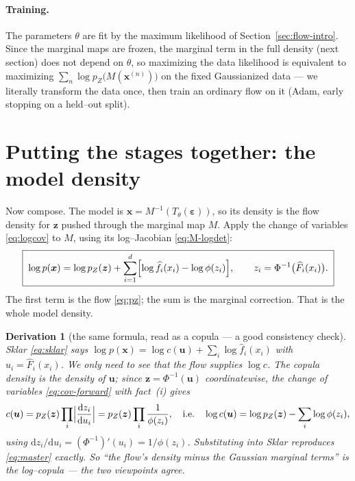 \documentclass[11pt]{article}
\newcommand{\x}{\bm{x}}
\newcommand{\z}{\bm{z}}
\newcommand{\uu}{\bm{u}}
\newcommand{\eps}{\bm{\varepsilon}}
\newcommand{\Fhat}{\widehat{F}}
\newcommand{\fhat}{\widehat{f}}
\newtheorem*{deriv}{Derivation}
\theoremstyle{remark}
\begin{document}
\paragraph{Training.}
The parameters $\theta$ are fit by the maximum likelihood of
Section~\ref{sec:flow-intro}. Since the marginal maps are frozen, the marginal
term in the full density (next section) does not depend on $\theta$, so
maximizing the data likelihood is equivalent to maximizing
$\sum_n\log p_Z\bigl(M(\x^{(n)})\bigr)$ on the fixed Gaussianized data --- we
literally transform the data once, then train an ordinary flow on it (Adam, early
stopping on a held--out split).

\section{Putting the stages together: the model density}
\label{sec:master}

Now compose. The model is $\x=M^{-1}(T_\theta(\eps))$, so its density is the flow
density for $\z$ pushed through the marginal map $M$. Apply the change of
variables \eqref{eq:logcov} to $M$, using its log--Jacobian \eqref{eq:M-logdet}:
\begin{equation}
\label{eq:master}
\boxed{\;
\log p(\x)=\log p_Z(\z)+\sum_{i=1}^{d}\Bigl[\log \fhat_i(x_i)-\log\phi(z_i)\Bigr],
\qquad z_i=\Phi^{-1}\bigl(\Fhat_i(x_i)\bigr).\;}
\end{equation}
The first term is the flow \eqref{eq:pz}; the sum is the marginal correction. That
is the whole model density.

\begin{deriv}[the same formula, read as a copula --- a good consistency check]
Sklar \eqref{eq:sklar} says $\log p(\x)=\log c(\uu)+\sum_i\log\fhat_i(x_i)$ with
$u_i=\Fhat_i(x_i)$. We only need to see that the flow supplies $\log c$. The
copula density is the density of $\uu$; since $\z=\Phi^{-1}(\uu)$ coordinatewise,
the change of variables \eqref{eq:cov-forward} with fact~(i) gives
\begin{equation}
c(\uu)=p_Z(\z)\prod_{i}\Bigl|\frac{\mathrm{d}z_i}{\mathrm{d}u_i}\Bigr|
      =p_Z(\z)\prod_i\frac{1}{\phi(z_i)},
\quad\text{i.e.}\quad
\log c(\uu)=\log p_Z(\z)-\sum_i\log\phi(z_i),
\end{equation}
using $\mathrm{d}z_i/\mathrm{d}u_i=(\Phi^{-1})'(u_i)=1/\phi(z_i)$. Substituting
into Sklar reproduces \eqref{eq:master} exactly. So ``the flow's density minus the
Gaussian marginal terms'' \emph{is} the log--copula --- the two viewpoints agree.
\end{deriv}
\end{document}

